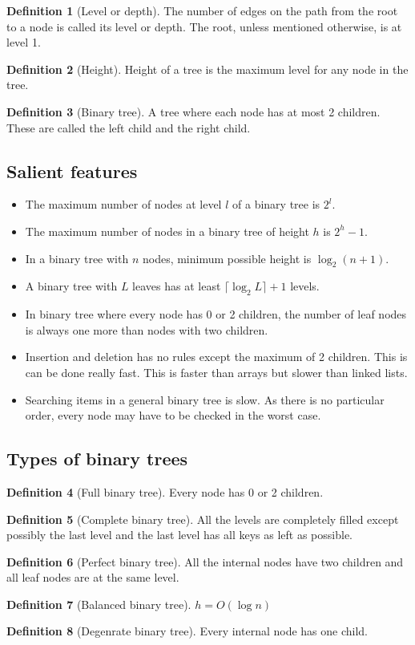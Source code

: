 \documentclass[10pt, a4paper]{extarticle}
\theoremstyle{definition}
\newtheorem{defn}{Definition}
\begin{document}
\begin{defn}[Level or depth]
	The number of edges on the path from the root to a node is called its level or depth. The root, unless mentioned otherwise, is at level 1.
\end{defn}

\begin{defn}[Height]
	Height of a tree is the maximum level for any node in the tree.
\end{defn}
\begin{defn}[Binary tree]
	A tree where each node has at most 2 children. These are called the left child and the right child.
\end{defn}
\subsection{Salient features}
\begin{itemize}
	\item The maximum number of nodes at level $l$ of a binary tree is $2^l$.
	\item The maximum number of nodes in a binary tree of height $h$ is $2^h-1$.
	\item In a binary tree with $n$ nodes, minimum possible height is $\log_2(n+1)$.
	\item A binary tree with $L$ leaves has at least $\lceil\log_2L\rceil+1$ levels.
	\item In binary tree where every node has 0 or 2 children, the number of leaf nodes is always one more than nodes with two children.
	\item Insertion and deletion has no rules except the maximum of 2 children. This is can be done really fast. This is faster than arrays but slower than linked lists.
	\item Searching items in a general binary tree is slow. As there is no particular order, every node may have to be checked in the worst case.
\end{itemize}
\subsection{Types of binary trees}
\begin{defn}[Full binary tree]
	Every node has 0 or 2 children.
\end{defn}
\begin{defn}[Complete binary tree]
	All the levels are completely filled except possibly the last level and the last level has all keys as left as possible.
\end{defn}
\begin{defn}[Perfect binary tree]
	All the internal nodes have two children and all leaf nodes are at the same level.
\end{defn}
\begin{defn}[Balanced binary tree]
	$h=O(\log n)$
\end{defn}
\begin{defn}[Degenrate binary tree]
	Every internal node has one child.
\end{defn}
\end{document}
